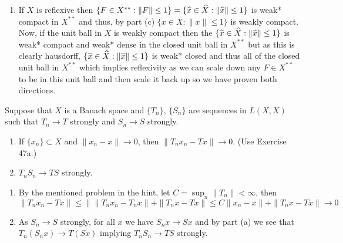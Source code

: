 \documentclass[12pt,a4paper]{article}
\begin{document}
\begin{solution}
\begin{enumerate}[label=\alph*.]
            By part (b) we can find $x\in X$ such that $F(f_j)=\hh{x}(f_j)$ and thus $\hh{x}\in\cap_1^nU_{F\hh{f}\ep}$ proving density of $\hh{X}$ in $X^{**}$ in the weak* topology and if we consider the closed unit ball $K=\{F\in X^{**}:\|F\|\leq 1\}$ then again from the previous part we can find $\hh{x}\in\cap_1^nU_{F\hh{f_j}\epsilon_j}$ such that $\|x\|=\|\hh{x}\|\leq(1+\epsilon)\|F\|\leq(1+\ep)$ with $\ep<\ep_j(1+\|f_j\|)^{-1}$ for all $j$ and thus $(1+\epsilon)^{-1}\hh{x}\in K\cap\hh{X}$, checking the inequalities
            \[
                |(1+\epsilon)^{-1}\hh{x}(f_j)-F(f_j)|=|\ep(1+\ep)^{-1}\hh{x}(f_j)|\leq\ep(1+\ep)^{-1}\|\hh{x}\|\|f_j\|<\ep_j
            \]
            so we still have $(1+\ep)^{-1}\hh{x}\in\cap_1^nU_{F\hh{f_j}\ep_j}\cap K$ proving the density of $\hh{X}\cap K$ in $K$. 
        \item If $X$ is reflexive then $\{F\in X^{**}:\|F\|\leq 1\}=\{\widehat{x}\in\widehat{X}:\|\widehat{x}\|\leq 1\}$ is weak* compact in $X^{**}$ and thus, by part (c) $\{x\in X:\|x\|\leq 1\}$ is weakly compact. 
            Now, if the unit ball in $X$ is weakly compact then the $\{\widehat{x}\in\widehat{X}:\|\widehat{x}\|\leq 1\}$ is weak* compact and weak* dense in the closed unit ball in $X^{**}$ but as this is clearly hausdorff, $\{\widehat{x}\in\widehat{X}:\|\widehat{x}\|\leq 1\}$ is weak* closed and thus all of the closed unit ball in $X^{**}$ which implies reflexivity as we can scale down any $F\in X^{**}$ to be in this unit ball and then scale it back up so we have proven both directions. 
    \end{enumerate}
\end{solution}
\begin{problem}\label{prob:5-53}
Suppose that $X$ is a Banach space and $\{T_n\}$, $\{S_n\}$ are sequences in $L(X,X)$ such that $T_n \rightarrow T$ strongly and $S_n \rightarrow S$ strongly.
\begin{enumerate}[label=\alph*.]
\item If $\{x_n\} \subset X$ and $\|x_n - x\| \rightarrow 0$, then $\|T_n x_n - Tx\| \rightarrow 0$. (Use Exercise 47a.)
\item $T_n S_n \rightarrow TS$ strongly.
\end{enumerate}
\end{problem}
\begin{solution}
    \begin{enumerate}[label=\alph*.]
        \item By the mentioned problem in the hint, let $C=\sup_n\|T_n\|<\infty$, then  
            \[
                \|T_nx_n-Tx\|\leq\|\|T_nx_n-T_nx\|+\|T_nx-Tx\|\leq C\|x_n-x\|+\|T_nx-Tx\|\to 0
            \]
        \item As $S_n\to S$ strongly, for all $x$ we have $S_nx\to Sx$ and by part (a) we see that $T_n(S_nx)\to T(Sx)$ implying $T_nS_n\to TS$ strongly. 
    \end{enumerate}
\end{solution}
\end{document}
